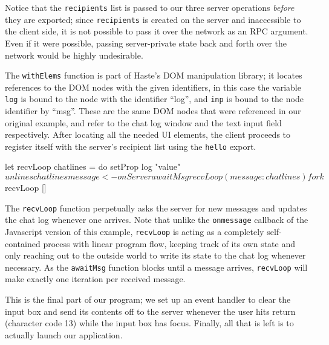 \documentclass[preprint]{sigplanconf}
\begin{document}
Notice that the \lstinline!recipients! list is passed to our three server
operations \emph{before} they are exported; since \lstinline!recipients! is
created on the server and inaccessible to the client side, it is not possible
to pass it over the network as an RPC argument. Even if it were possible,
passing server-private state back and forth over the network would be highly
undesirable.

The \lstinline!withElems! function is part of Haste's DOM manipulation library;
it locates references to the DOM nodes with the given identifiers, in this case
the variable \lstinline!log! is bound to the node with the identifier ``log'',
and \lstinline!inp! is bound to the node identifier by ``msg''. These are the
same DOM nodes that were referenced in our original example, and refer
to the chat log window and the text input field respectively. After locating
all the needed UI elements, the client proceeds to register itself with the
server's recipient list using the \lstinline!hello! export.

\begin{code}
      let recvLoop chatlines = do
            setProp log "value" $ unlines chatlines
            message <- onServer awaitMsg
            recvLoop (message : chatlines)
      fork $ recvLoop []
\end{code}

The \lstinline!recvLoop! function perpetually asks the server for new messages
and updates the chat log whenever one arrives. Note that unlike the
\lstinline!onmessage! callback of the Javascript version of this example,
\lstinline!recvLoop! is acting as a completely self-contained process with
linear program flow, keeping track of its own state and only reaching out to
the outside world to write its state to the chat log whenever necessary. As
the \lstinline!awaitMsg! function blocks until a message arrives,
\lstinline!recvLoop! will make exactly one iteration per received message.


This is the final part of our program; we set up an event handler to clear the
input box and send its contents off to the server whenever the user hits return
(character code 13) while the input box has focus. Finally, all that is left
is to actually launch our application.
\end{document}
